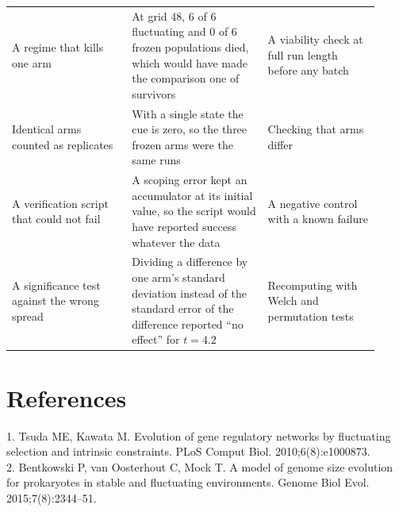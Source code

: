 \begin{longtable}{@{}p{0.3\linewidth}p{0.34\linewidth}p{0.28\linewidth}@{}}
A regime that kills one arm & At grid 48, 6 of 6 fluctuating and 0 of 6 frozen
populations died, which would have made the comparison one of survivors & A
viability check at full run length before any batch\\
Identical arms counted as replicates & With a single state the cue is zero, so
the three frozen arms were the same runs & Checking that arms differ\\
A verification script that could not fail & A scoping error kept an accumulator
at its initial value, so the script would have reported success whatever the
data & A negative control with a known failure\\
A significance test against the wrong spread & Dividing a difference by one arm's standard deviation instead of the standard error of the difference reported ``no effect'' for $t=4.2$ & Recomputing with Welch and permutation tests\\
\bottomrule
\end{longtable}

\section*{References}
\small
1. Tsuda ME, Kawata M. Evolution of gene regulatory networks by fluctuating
selection and intrinsic constraints. PLoS Comput Biol. 2010;6(8):e1000873.\\
2. Bentkowski P, van Oosterhout C, Mock T. A model of genome size evolution for
prokaryotes in stable and fluctuating environments. Genome Biol Evol.
2015;7(8):2344--51.


